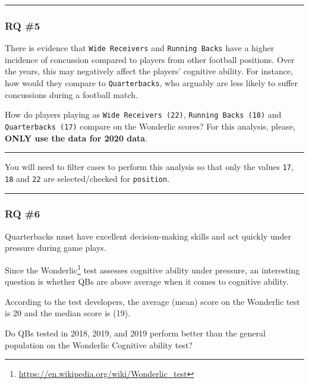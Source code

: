 \documentclass[
]{article}
\begin{document}
\begin{center}\rule{0.5\linewidth}{0.5pt}\end{center}

\hypertarget{rq-5}{%
\subsubsection{RQ \#5}\label{rq-5}}

There is evidence that \texttt{Wide\ Receivers} and \texttt{Running\ Backs} have a higher incidence of concussion compared to players from other football positions. Over the years, this may negatively affect the players' cognitive ability. For instance, how would they compare to \texttt{Quarterbacks}, who arguably are less likely to suffer concussions during a football match.

How do players playing as \texttt{Wide\ Receivers\ (22)}, \texttt{Running\ Backs\ (18)} and \texttt{Quarterbacks\ (17)} compare on the Wonderlic scores? For this analysis, please, \textbf{ONLY use the data for 2020 data}.

\begin{center}\rule{0.5\linewidth}{0.5pt}\end{center}

You will need to filter cases to perform this analysis so that only the values \texttt{17}, \texttt{18} and \texttt{22} are selected/checked for \texttt{position}.

\begin{center}\rule{0.5\linewidth}{0.5pt}\end{center}

\hypertarget{rq-6}{%
\subsubsection{RQ \#6}\label{rq-6}}

Quarterbacks must have excellent decision-making skills and act quickly under pressure during game plays.

Since the Wonderlic\footnote{\url{https://en.wikipedia.org/wiki/Wonderlic_test}} test assesses cognitive ability under pressure, an interesting question is whether QBs are above average when it comes to cognitive ability.

According to the test developers, the average (mean) score on the Wonderlic test is 20 and the median score is (19).

Do QBs tested in 2018, 2019, and 2019 perform better than the general population on the Wonderlic Cognitive ability test?
\end{document}
